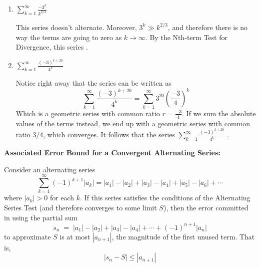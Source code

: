 \documentclass[main]{subfiles}
\begin{document}
\begin{enumerate}
\begin{enumerate}
  \item  
  \begin{problem}[\vfill]
     $\displaystyle\sum_{k=1}^\infty \frac{- 3^k}{k^ {2/3}}$
  \end{problem}

  \begin{solution}
  This series doesn't alternate.  Moreover, $3^k \gg k^{2/3}$, and therefore 
  there is no way the terms are going to zero as $k \to \infty$.  By
  the Nth-term Test for Divergence, this series .
  \end{solution}


  \item  
  \begin{problem}[\vfill] 
    $\displaystyle\sum_{k=1}^\infty \frac{(-3)^{k+ 20}}{4^ {k}}$
  \end{problem}

  \begin{solution}
  Notice right away that the series can be written as 
  \[\sum_{k=1}^\infty \frac{(-3)^{k+ 20}}{4^ {k}} = \sum_{k=1}^\infty 3^{20} 
  \left(\frac{-3}{4}\right)^{k}\]
  Which is a geometric series with common ratio $r=\frac{-3}{4}$.  If we sum
  the absolute values of the terms instead, we end up with a geometric series
  with common ratio $3/4$, which converges.  It follows that the series 
  $\displaystyle\sum_{k=1}^\infty \frac{(-3)^{k+ 20}}{4^ {k}}$ 
  .
  \end{solution}

\end{enumerate}






\pspace{\newpage}



\begin{problemonly}
\begin{framed}
\centerline{\textbf{Associated Error Bound for a Convergent Alternating Series:}}

Consider an alternating series
$$
\sum_{k=1}^\infty (-1)^{k+1} |a_k| = |a_1| - |a_2| + |a_3| - |a_4| + |a_5| - |a_6| + \cdots
$$
where $|a_k| > 0$ for each $k$.  If this series satisfies the conditions of the 
Alternating Series Test (and therefore converges to some limit $S$), then the 
error committed in using the partial sum
$$
  s_n \; = \;   |a_1| - |a_2| + |a_3| - |a_4| + \cdots + (-1)^{n+1} |a_n|
$$
to approximate $S$ is at most $|a_{n+1}|$, the magnitude of the first unused term.
That is, $$|s_n - S| \leq |a_{n+1}|$$
\end{framed}
\end{problemonly}



\end{enumerate}
\end{document}
